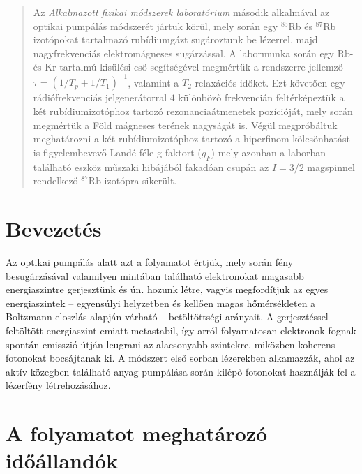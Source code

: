 \begin{abstract}
    \noindent Az \emph{Alkalmazott fizikai módszerek laboratórium} második alkalmával az optikai pumpálás módszerét jártuk körül, mely során egy $^{85}$Rb és $^{87}$Rb izotópokat tartalmazó rubídiumgázt sugároztunk be lézerrel, majd nagyfrekvenciás elektromágneses sugárzással. A labormunka során egy Rb- és Kr-tartalmú kisülési cső segítségével megmértük a rendszerre jellemző $\tau = \left( 1/T_{p} + 1/T_{1} \right)^{-1}$, valamint a $T_{2}$ relaxációs időket. Ezt követően egy rádiófrekvenciás jelgenerátorral $4$ különböző frekvencián feltérképeztük a két rubídiumizotóphoz tartozó rezonanciaátmenetek pozícióját, mely során megmértük a Föld mágneses terének nagyságát is. Végül megpróbáltuk meghatározni a két rubídiumizotóphoz tartozó a hiperfinom kölcsönhatást is figyelembevevő Landé-féle g-faktort ($g_{F}$) mely azonban a laborban található eszköz műszaki hibájából fakadóan csupán az $I=3/2$ magspinnel rendelkező $^{87}$Rb izotópra sikerült.
\end{abstract}

\begin{multicols}{2}
\section{Bevezetés}
Az optikai pumpálás alatt azt a folyamatot értjük, mely során fény besugárzásával valamilyen mintában található elektronokat magasabb energiaszintre gerjesztünk és ún.  hozunk létre, vagyis megfordítjuk az egyes energiaszintek -- egyensúlyi helyzetben és kellően magas hőmérsékleten a Boltzmann-eloszlás alapján várható -- betöltöttségi arányait. A gerjesztéssel feltöltött energiaszint emiatt metastabil, így arról folyamatosan elektronok fognak spontán emisszió útján leugrani az alacsonyabb szintekre, miközben koherens fotonokat bocsájtanak ki. A módszert első sorban lézerekben alkamazzák, ahol az aktív közegben található anyag pumpálása során kilépő fotonokat használják fel a lézerfény létrehozásához.

\section{A folyamatot meghatározó időállandók}


\end{multicols}